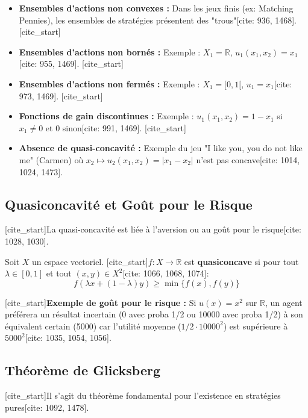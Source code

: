 \begin{itemize}
    [cite_start]\item \textbf{Ensembles d'actions non convexes :} Dans les jeux finis (ex: Matching Pennies), les ensembles de stratégies présentent des "trous"[cite: 936, 1468].
    [cite_start]\item \textbf{Ensembles d'actions non bornés :} Exemple : $X_1 = \mathbb{R}$, $u_1(x_1, x_2) = x_1$[cite: 955, 1469].
    [cite_start]\item \textbf{Ensembles d'actions non fermés :} Exemple : $X_1 = [0, 1[$, $u_1 = x_1$[cite: 973, 1469].
    [cite_start]\item \textbf{Fonctions de gain discontinues :} Exemple : $u_1(x_1, x_2) = 1-x_1$ si $x_1 \neq 0$ et $0$ sinon[cite: 991, 1469].
    [cite_start]\item \textbf{Absence de quasi-concavité :} Exemple du jeu "I like you, you do not like me" (Carmen) où $x_2 \mapsto u_2(x_1, x_2) = |x_1 - x_2|$ n'est pas concave[cite: 1014, 1024, 1473].
\end{itemize}

\subsection{Quasiconcavité et Goût pour le Risque}
[cite_start]La quasi-concavité est liée à l'aversion ou au goût pour le risque[cite: 1028, 1030]. 

\begin{definition}[Quasiconcavité]
Soit $X$ un espace vectoriel. [cite_start]$f: X \rightarrow \mathbb{R}$ est \textbf{quasiconcave} si pour tout $\lambda \in [0,1]$ et tout $(x, y) \in X^2$[cite: 1066, 1068, 1074]:
$$f(\lambda x + (1-\lambda)y) \ge \min\{f(x), f(y)\}$$
\end{definition}

[cite_start]\textbf{Exemple de goût pour le risque :} Si $u(x) = x^2$ sur $\mathbb{R}$, un agent préférera un résultat incertain (0 avec proba 1/2 ou 10000 avec proba 1/2) à son équivalent certain (5000) car l'utilité moyenne ($1/2 \cdot 10000^2$) est supérieure à $5000^2$[cite: 1035, 1054, 1056].

\subsection{Théorème de Glicksberg}
[cite_start]Il s'agit du théorème fondamental pour l'existence en stratégies pures[cite: 1092, 1478].

